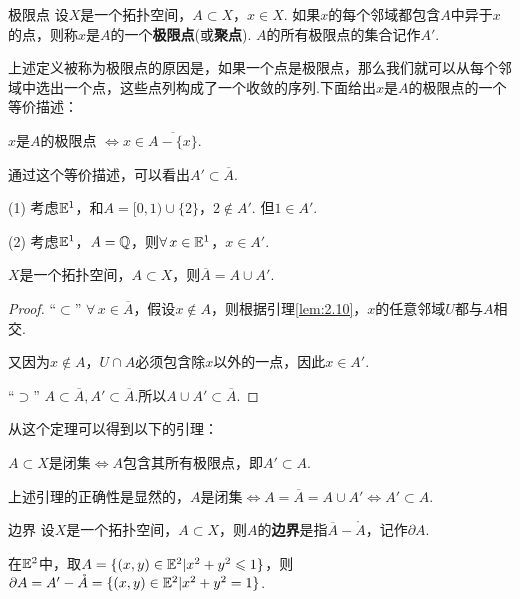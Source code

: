 \begin{definition}{极限点}
    设$X$是一个拓扑空间，$A\subset X$，$x\in X$. 如果$x$的每个邻域都包含$A$中异于$x$的点，则称$x$是$A$的一个\textbf{极限点}(或\textbf{聚点}). $A$的所有极限点的集合记作$A'$.
\end{definition}
上述定义被称为极限点的原因是，如果一个点是极限点，那么我们就可以从每个邻域中选出一个点，这些点列构成了一个收敛的序列.下面给出$x$是$A$的极限点的一个等价描述：
\begin{note}
    $x$是$A$的极限点 $\Leftrightarrow x\in\overline{A-\{x\}}$.
\end{note}
通过这个等价描述，可以看出$A'\subset\overline{A}$.\par

\begin{instance}
    (1)\; 考虑$\mathbb{E}^1$，和$A=[0,1)\cup\{2\}$，$2\notin A'$. 但$1\in A'$.\par
    (2)\; 考虑$\mathbb{E}^1$，$A=\mathbb{Q}$，则$\forall\, x\in\mathbb{E}^1$，$x\in A'$.
\end{instance}

\begin{proposition}
    $X$是一个拓扑空间，$A\subset X$，则$\overline{A}=A\cup A'$.
\end{proposition}
\begin{proof}
    “$\subset$” $\forall\,x\in\overline{A}$，假设$x\notin A$，则根据引理\ref{lem:2.10}，$x$的任意邻域$U$都与$A$相交.\par
    又因为$x\notin A$，$U\cap A$必须包含除$x$以外的一点，因此$x\in A'$.\par
    “$\supset$” $A\subset\overline{A},A'\subset\overline{A}$.所以$A\cup A'\subset\overline{A}$.
\end{proof}

从这个定理可以得到以下的引理：

\begin{corollary}
    $A\subset X$是闭集$\Leftrightarrow A$包含其所有极限点，即$A'\subset A$.
\end{corollary}
上述引理的正确性是显然的，$A$是闭集$\Leftrightarrow A=\overline{A}=A\cup A'\Leftrightarrow A'\subset A$.\par

\begin{definition}{边界}
    设$X$是一个拓扑空间，$A\subset X$，则$A$的\textbf{边界}是指$\overline{A}-\mathring{A}$，记作$\partial A$.
\end{definition}

\begin{instance}
    在$\mathbb{E}^2$中，取$A=\{(x,y)\in\mathbb{E}^2|x^2+y^2\leqslant 1\}$，则$\partial A=A'-\mathring{A}=\{(x,y)\in\mathbb{E}^2|x^2+y^2=1\}$.
\end{instance}

